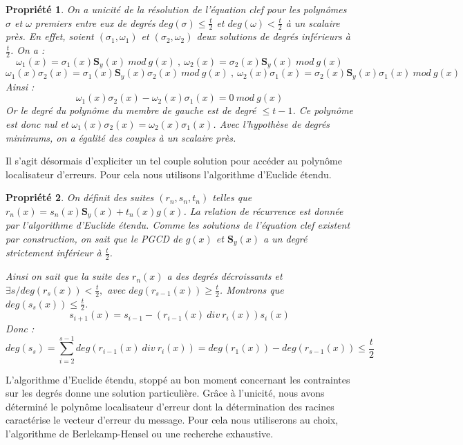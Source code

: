\documentclass{article}
\newtheorem{prop}{Propriété}
\begin{document}
		\begin{prop} \label{unicite} \cite{goppa}
			On a unicité de la résolution de l'équation clef pour les polynômes $\sigma$ et $\omega$ premiers entre eux de degrés  $deg(\sigma) \leq \frac{t}{2}$ et $ deg(\omega) < \frac{t}{2} $ à un scalaire près.
			En effet, soient $(\sigma_{1},\omega_{1})$ et $(\sigma_{2},\omega_{2})$ deux solutions de degrés inférieurs à $\frac{t}{2}$.
			On a :
			$$ \omega_{1}(x) = \sigma_{1}(x)\mathbf{S}_{y}(x) \ mod \ g(x) \ , \ \omega_{2}(x) = \sigma_{2}(x)\mathbf{S}_{y}(x) \ mod \ g(x) $$
			$$ \omega_{1}(x)\sigma_{2}(x) = \sigma_{1}(x)\mathbf{S}_{y}(x)\sigma_{2}(x) \ mod \ g(x) \ , \ \omega_{2}(x)\sigma_{1}(x) = \sigma_{2}(x)\mathbf{S}_{y}(x)\sigma_{1}(x) \ mod \ g(x) $$
			Ainsi :
			$$ \omega_{1}(x)\sigma_{2}(x) - \omega_{2}(x)\sigma_{1}(x) = 0 \ mod \ g(x) $$
			Or le degré du polynôme du membre de gauche est de degré $\leq t-1$.
			Ce polynôme est donc nul et $ \omega_{1}(x)\sigma_{2}(x) = \omega_{2}(x)\sigma_{1}(x) $.
			Avec l'hypothèse de degrés minimums, on a égalité des couples à un scalaire près.
		\end{prop}

		Il s'agit désormais d'expliciter un tel couple solution pour accéder au polynôme localisateur d'erreurs.
		Pour cela nous utilisons l'algorithme d'Euclide étendu.

		\begin{prop} \label{existence}
			On définit des suites $(r_{n},s_{n},t_{n})$ telles que $ r_{n}(x) = s_{n}(x)\mathbf{S}_{y}(x) + t_{n}(x)g(x) $.
			La relation de récurrence est donnée par l'algorithme d'Euclide étendu.
			Comme les solutions de l'équation clef existent par construction, on sait que le PGCD de $g(x)$ et $\mathbf{S}_{y}(x)$ a un degré strictement inférieur à $\frac{t}{2}$.

			Ainsi on sait que la suite des $r_{n}(x)$ a des degrés décroissants et $\exists s / deg(r_{s}(x)) < \frac{t}{2},$ avec $deg(r_{s-1}(x)) \geq \frac{t}{2}$.
			Montrons que $deg(s_{s}(x)) \leq \frac{t}{2}$.
			$$ s_{i+1}(x) = s_{i-1} - (r_{i-1}(x) \ div  \ r_{i}(x))s_{i}(x) $$
			Donc :
			$$ deg(s_{s}) = \sum_{i=2}^{s-1} deg(r_{i-1}(x) \ div  \ r_{i}(x)) = deg(r_{1}(x)) - deg(r_{s-1}(x)) \leq \frac{t}{2}$$
		\end{prop}

		L'algorithme d'Euclide étendu, stoppé au bon moment concernant les contraintes sur les degrés donne une solution particulière.
		Grâce à l'unicité, nous avons déterminé le polynôme localisateur d'erreur dont la détermination des racines caractérise le vecteur d'erreur du message.
		Pour cela nous utiliserons au choix, l'algorithme de Berlekamp-Hensel ou une recherche exhaustive.





\end{document}
